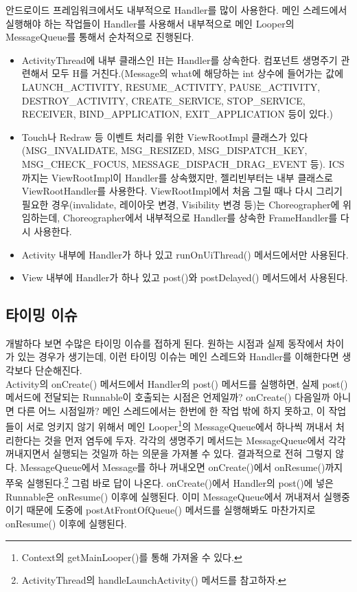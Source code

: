 안드로이드 프레임워크에서도 내부적으로 Handler를 많이 사용한다. 메인 스레드에서 실행해야 하는 작업들이 Handler를 사용해서 내부적으로 메인 Looper의 MessageQueue를 통해서 순차적으로 진행된다.
\begin{itemize}
\item ActivityThread에 내부 클래스인 H는 Handler를 상속한다. 컴포넌트 생명주기 관련해서 모두 H를 거친다.(Message의 what에 해당하는 int 상수에 들어가는 값에 LAUNCH\_ACTIVITY, RESUME\_ACTIVITY, PAUSE\_ACTIVITY, DESTROY\_ACTIVITY, CREATE\_SERVICE, STO\-P\_SERVICE, RECEIVER, BIND\_APPLICATION, EXIT\_APPLICATION 등이 있다.)
\item Touch나 Redraw 등 이벤트 처리를 위한 ViewRootImpl 클래스가 있다(MSG\_INVALIDATE, MSG\_R\-E\-SIZED, MSG\_DISPATCH\_KEY, MSG\_CHECK\_FOCUS, MESSAGE\_DISPACH\_DRAG\_EV\-ENT 등).
ICS까지는 ViewRootImpl이 Handler를 상속했지만, 젤리빈부터는 내부 클래스로 ViewRootHandler를 사용한다.
ViewRootImpl에서 처음 그릴 때나 다시 그리기 필요한 경우(invalidate, 레이아웃 변경, Visibility 변경 등)는 Choreographer에 위임하는데, Choreographer에서 내부적으로 Handler를 상속한 FrameHandler를 다시 사용한다.
\item Activity 내부에 Handler가 하나 있고 runOnUiThread() 메서드에서만 사용된다. 
\item View 내부에 Handler가 하나 있고 post()와 postDelayed() 메서드에서 사용된다.
\end{itemize}

\subsection{타이밍 이슈}
개발하다 보면 수많은 타이밍 이슈를 접하게 된다. 원하는 시점과 실제 동작에서 차이가 있는 경우가 생기는데, 이런 타이밍 이슈는 메인 스레드와 Handler를 이해한다면 생각보다 단순해진다.\\

Activity의 onCreate() 메서드에서 Handler의 post() 메서드를 실행하면, 실제 post() 메서드에 전달되는 Runnable이 호출되는 시점은 언제일까? onCreate() 다음일까 아니면 다른 어느 시점일까?
메인 스레드에서는 한번에 한 작업 밖에 하지 못하고, 이 작업들이 서로 엉키지 않기 위해서 메인 Looper\footnote{Context의 getMainLooper()를 통해 가져올 수 있다.}의 MessageQueue에서 하나씩 꺼내서 처리한다는 것을 먼저 염두에 두자.
각각의 생명주기 메서드는 MessageQueue에서 각각 꺼내지면서 실행되는 것일까 하는 의문을 가져볼 수 있다. 결과적으로 전혀 그렇지 않다.
MessageQueue에서 Message를 하나 꺼내오면 onCreate()에서 onResume()까지 쭈욱 실행된다.\footnote{ActivityThread의 handleLaunchActivity() 메서드를 참고하자.} 그럼 바로 답이 나온다. 
onCreate()에서 Handler의 post()에 넣은 Runnable은 onResume() 이후에 실행된다.
이미 MessageQueue에서 꺼내져서 실행중이기 때문에 도중에 postAtFrontOfQueue() 메서드를 실행해봐도 마찬가지로 onResume() 이후에 실행된다.\\

